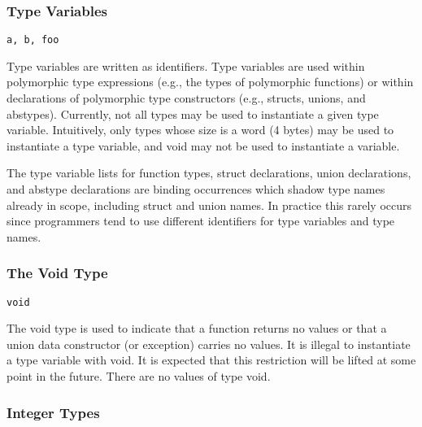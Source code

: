 \documentclass[titlepage,10pt]{article}
\begin{document}
\subsubsection{Type Variables}


\begin{verbatim}
a, b, foo
\end{verbatim}

Type variables are written as identifiers.  Type variables are used
within polymorphic type expressions (e.g., the types of polymorphic
functions) or within declarations of polymorphic type constructors
(e.g., structs, unions, and abstypes).  Currently, not all types may be
used to instantiate a given type variable.  Intuitively, only types
whose size is a word (4 bytes) may be used to instantiate a type
variable, and void may not be used to instantiate a variable.

The type variable lists for function types, struct declarations, union
declarations, and abstype declarations are binding occurrences which
shadow type names already in scope, including struct and union names.
In practice this rarely occurs since programmers tend to use different
identifiers for type variables and type names.

\subsubsection{The Void Type}


\begin{verbatim}
void
\end{verbatim}

The void type is used to indicate that a function returns no values or
that a union data constructor (or exception) carries no values.  It is
illegal to instantiate a type variable with void.  It is expected that
this restriction will be lifted at some point in the future.  There are
no values of type void.

\subsubsection{Integer Types}

\end{document}
